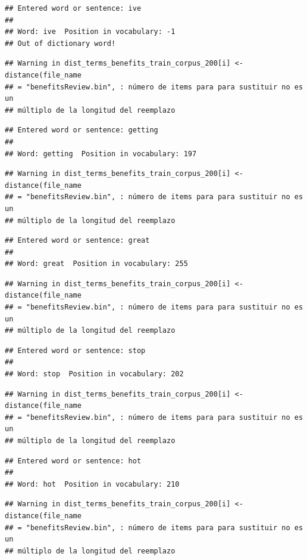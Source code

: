 \documentclass[spanish,]{article}
\begin{document}
\begin{verbatim}
## Entered word or sentence: ive
## 
## Word: ive  Position in vocabulary: -1
## Out of dictionary word!
\end{verbatim}

\begin{verbatim}
## Warning in dist_terms_benefits_train_corpus_200[i] <- distance(file_name
## = "benefitsReview.bin", : número de items para para sustituir no es un
## múltiplo de la longitud del reemplazo
\end{verbatim}

\begin{verbatim}
## Entered word or sentence: getting
## 
## Word: getting  Position in vocabulary: 197
\end{verbatim}

\begin{verbatim}
## Warning in dist_terms_benefits_train_corpus_200[i] <- distance(file_name
## = "benefitsReview.bin", : número de items para para sustituir no es un
## múltiplo de la longitud del reemplazo
\end{verbatim}

\begin{verbatim}
## Entered word or sentence: great
## 
## Word: great  Position in vocabulary: 255
\end{verbatim}

\begin{verbatim}
## Warning in dist_terms_benefits_train_corpus_200[i] <- distance(file_name
## = "benefitsReview.bin", : número de items para para sustituir no es un
## múltiplo de la longitud del reemplazo
\end{verbatim}

\begin{verbatim}
## Entered word or sentence: stop
## 
## Word: stop  Position in vocabulary: 202
\end{verbatim}

\begin{verbatim}
## Warning in dist_terms_benefits_train_corpus_200[i] <- distance(file_name
## = "benefitsReview.bin", : número de items para para sustituir no es un
## múltiplo de la longitud del reemplazo
\end{verbatim}

\begin{verbatim}
## Entered word or sentence: hot
## 
## Word: hot  Position in vocabulary: 210
\end{verbatim}

\begin{verbatim}
## Warning in dist_terms_benefits_train_corpus_200[i] <- distance(file_name
## = "benefitsReview.bin", : número de items para para sustituir no es un
## múltiplo de la longitud del reemplazo
\end{verbatim}
\end{document}
